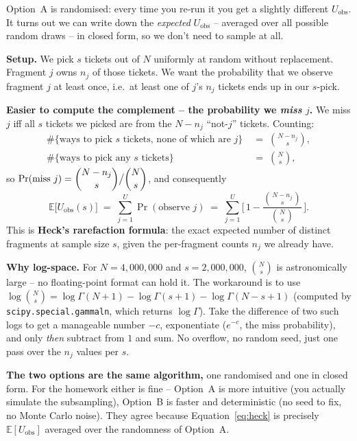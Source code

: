 \documentclass[11pt]{article}
\newcommand{\E}{\mathbb{E}}
\newcommand{\Uobs}{U_{\mathrm{obs}}}
\begin{document}
\begin{tcolorbox}[breakable,colback=blue!4,colframe=blue!55!black,title=\textbf{Option B: Heck's rarefaction (the same thing, but in closed form)}]
Option~A is randomised: every time you re-run it you get a slightly different $\Uobs$.
It turns out we can write down the \emph{expected} $\Uobs$ -- averaged over all possible
random draws -- in closed form, so we don't need to sample at all.

\textbf{Setup.} We pick $s$ tickets out of $N$ uniformly at random without replacement.
Fragment $j$ owns $n_j$ of those tickets. We want the probability that we observe
fragment $j$ at least once, i.e.\ at least one of $j$'s $n_j$ tickets ends up in our
$s$-pick.

\textbf{Easier to compute the complement -- the probability we \emph{miss} $j$.} We
miss $j$ iff all $s$ tickets we picked are from the $N - n_j$ ``not-$j$'' tickets.
Counting:
\begin{align*}
   \#\{\text{ways to pick } s \text{ tickets, none of which are } j\}
       &\;=\; \binom{N - n_j}{s}, \\
   \#\{\text{ways to pick any } s \text{ tickets}\}
       &\;=\; \binom{N}{s},
\end{align*}
so $\Pr(\text{miss } j) = \dbinom{N - n_j}{s} \big/ \dbinom{N}{s}$, and consequently
\begin{equation}
   \E\bigl[\Uobs(s)\bigr]
   \;=\; \sum_{j=1}^{U} \Pr(\text{observe } j)
   \;=\; \sum_{j=1}^{U} \!\Biggl[\, 1 - \frac{\binom{N - n_j}{s}}{\binom{N}{s}} \,\Biggr].
   \label{eq:heck}
\end{equation}
This is \textbf{Heck's rarefaction formula}: the exact expected number of distinct
fragments at sample size $s$, given the per-fragment counts $n_j$ we already have.

\textbf{Why log-space.} For $N = 4{,}000{,}000$ and $s = 2{,}000{,}000$, $\binom{N}{s}$
is astronomically large -- no floating-point format can hold it. The workaround is to
use $\log \binom{N}{s} = \log\Gamma(N+1) - \log\Gamma(s+1) - \log\Gamma(N - s + 1)$
(computed by \texttt{scipy.special.gammaln}, which returns $\log\Gamma$). Take the
difference of two such logs to get a manageable number $-c$, exponentiate
($e^{-c}$, the miss probability), and only \emph{then} subtract from $1$ and sum. No
overflow, no random seed, just one pass over the $n_j$ values per $s$.
\end{tcolorbox}

\textbf{The two options are the same algorithm,} one randomised and one in closed form.
For the homework either is fine -- Option~A is more intuitive (you actually simulate
the subsampling), Option~B is faster and deterministic (no seed to fix, no Monte Carlo
noise). They agree because Equation~\eqref{eq:heck} is precisely $\E[\Uobs]$ averaged
over the randomness of Option~A.
\end{document}
